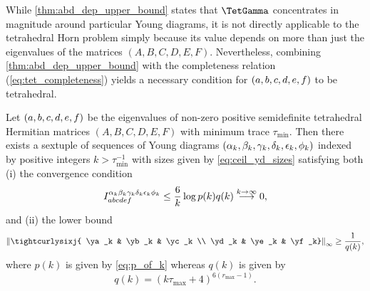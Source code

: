 \documentclass[notitlepage, 10pt]{article}
\begin{document}
While \cref{thm:abd_dep_upper_bound} states that $\TetGamma$ concentrates in magnitude around particular Young diagrams, it is not directly applicable to the tetrahedral Horn problem simply because its value depends on more than just the eigenvalues of the matrices $(A,B,C,D,E,F)$. 
Nevertheless, combining \cref{thm:abd_dep_upper_bound} with the completeness relation (\cref{eq:tet_completeness}) yields a necessary condition for $(a,b,c,d,e,f)$ to be tetrahedral.
\begin{cor}
    \label{cor:tet_sixj_lower_bound}
    Let $(a,b,c,d,e,f)$ be the eigenvalues of non-zero positive semidefinite tetrahedral Hermitian matrices $(A,B,C,D,E,F)$ with minimum trace $\tau_{\min}$.
    Then there exists a sextuple of sequences of Young diagrams $(\alpha_k, \beta_k, \gamma_k, \delta_k, \epsilon_k, \phi_k)$ indexed by positive integers $k > \tau_{\min}^{-1}$ with sizes given by \cref{eq:ceil_yd_sizes}
    satisfying both (i) the convergence condition
    \begin{equation}
        \label{eq:sextuple_convergence_rate}
        I^{\alpha_k\beta_k\gamma_k\delta_k\epsilon_k\phi_k}_{abcdef} 
        \leq \frac{6}{k} \log p(k) q(k) 
        \stackrel{k\to\infty}{\longrightarrow} 0,
    \end{equation}
    and (ii) the lower bound 
    \begin{equation}
        \label{eq:ud_sixj_lower_bound}
        \norm{\tightcurlysixj{ \ya_k & \yb_k & \yc_k \\ \yd_k &  \ye_k &  \yf_k}}_{\infty}
        \geq \frac{1}{q(k)},
    \end{equation}
    where $p(k)$ is given by \cref{eq:p_of_k} whereas $q(k)$ is given by
    \begin{equation}
        \label{eq:q_of_k}
        q(k) = (k \tau_{\max} +4)^{6(r_{\max}-1)}.
    \end{equation}
\end{cor}
\end{document}
